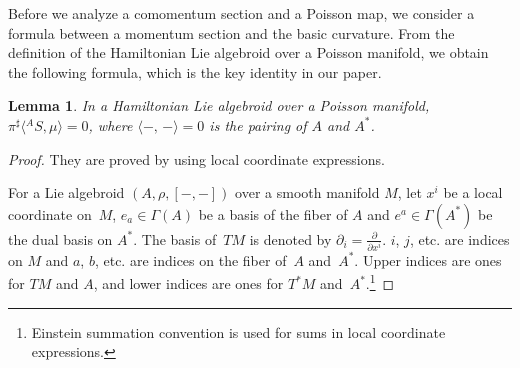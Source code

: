 \documentclass[10pt,a4paper]{amsart}
\numberwithin{equation}{section}
\newtheorem{Lemma}[Theorem]{Lemma}
\newcommand{\bracket}[2]{\langle #1,\,#2\rangle}
\begin{document}
Before we analyze a comomentum section and a Poisson map,
we consider a formula between a momentum section and the basic curvature.
From the definition of the Hamiltonian Lie algebroid over a Poisson manifold,
we obtain the following formula, which is the key identity in our paper.
\begin{Lemma}\label{basicms}
In a Hamiltonian Lie algebroid over a Poisson manifold,
$\pi^{\sharp} \bigl\langle{}^A S,\mu\bigr\rangle =0$,
where $\bracket{-}{-} =0$ is the pairing of $A$ and $A^*$.
\end{Lemma}
\begin{proof}
They are proved by using local coordinate expressions.

For a Lie algebroid $(A, \rho, [-,-])$ over a smooth manifold $M$,
let $x^i$ be a local coordinate on~$M$, $e_a \in \Gamma(A)$ be a basis of the fiber of $A$ and $e^a \in \Gamma(A^*)$ be the dual basis on $A^*$.
The basis of~$TM$ is denoted by $\partial_i = \tfrac{\partial}{\partial x^i}$.
$i$, $j$, etc. are indices on $M$ and $a$, $b$, etc. are indices on
the fiber of~$A$ and~$A^*$.
Upper indices are ones for $TM$ and $A$, and lower indices are ones
for $T^*M$ and~$A^*$.\footnote{Einstein summation convention is used for
sums in local coordinate expressions.}


\end{proof}
\end{document}
